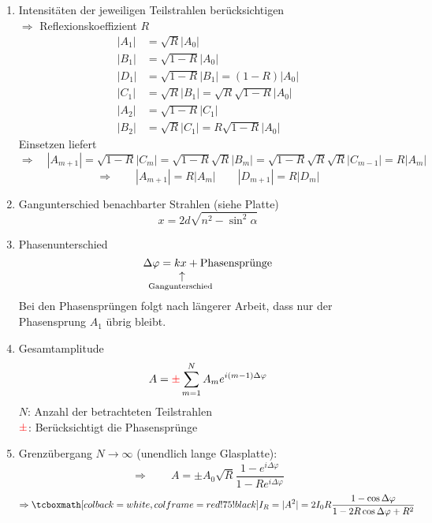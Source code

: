 \begin{enumerate}[(1)]
	\item Intensitäten der jeweiligen Teilstrahlen berücksichtigen\\
	$ \Rightarrow $ Reflexionskoeffizient $ R $
	\begin{align*}
	|A_1| &= \sqrt{R} |A_0|\\
	|B_1| &= \sqrt{1 - R} |A_0|\\
	|D_1| &= \sqrt{1-R} |B_1| = (1-R) |A_0|\\
	|C_1| &= \sqrt{R} |B_1| = \sqrt{R}\sqrt{1 - R} |A_0|\\[7pt]
	|A_2| &= \sqrt{1 - R} |C_1|\\
	|B_2| &= \sqrt{R} |C_1| = R \sqrt{1 - R} |A_0|
	\end{align*}
	Einsetzen liefert\\
	$\Rightarrow \quad |A_{m+1}| = \sqrt{1-R} |C_m| = \sqrt{1-R} \sqrt{R} |B_m| = \sqrt{1-R} \sqrt{R} \sqrt{R} |C_{m-1}| = R |A_m|$
	\vspace{5pt}
	\begin{equation*}
	\Rightarrow \qquad |A_{m+1}| = R |A_m| \qquad |D_{m+1}| = R |D_m|
	\end{equation*}
	\item Gangunterschied benachbarter Strahlen (siehe Platte)
	\begin{equation*}
	x = 2d \sqrt{n^2 - \sin^2 \alpha} 
	\end{equation*}
	\item Phasenunterschied
	\begin{equation*}
	\Delta \varphi = \custo{\leftarrow}{kx}{\mathclap{\tx{Gangunterschied}}} + \tx{Phasensprünge}
	\end{equation*}
	Bei den Phasensprüngen folgt nach längerer Arbeit, dass nur der Phasensprung $ A_1 $ übrig bleibt.
	\item Gesamtamplitude
	\begin{equation*}
	A = \color{red} \pm \color{black} \sum_{m=1}^{N} A_m e^{i(m-1) \Delta \varphi}
	\end{equation*}
	$ N $: Anzahl der betrachteten Teilstrahlen\\
	$ \color{red} \pm \color{black} $: Berücksichtigt die Phasensprünge
	\item Grenzübergang $ N \to \infty $ (unendlich lange Glasplatte):
	\begin{equation*}
	\Rightarrow \qquad A = \pm A_0 \sqrt{R} \frac{1 - e^{i \Delta \varphi}}{1 - R e^{i \Delta \varphi}}
	\end{equation*}
	\begin{equation*}
	\Rightarrow \rmbox{I_R = |A^2| = 2 I_0 R \frac{1 - \cos \Delta \varphi}{1 - 2 R \cos \Delta \varphi + R^2}}
	\end{equation*}
\end{enumerate}

